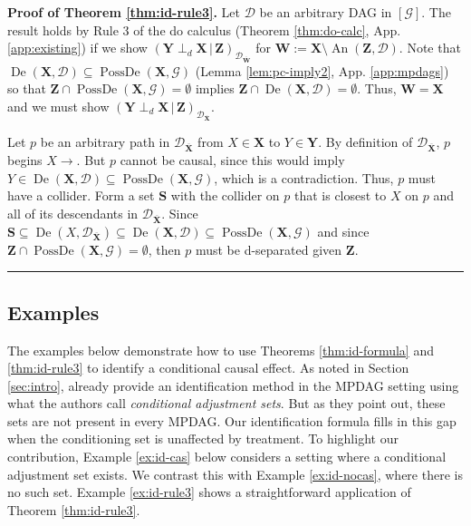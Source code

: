 \documentclass[11pt]{article}
\DeclareMathOperator{\An}{An}
\DeclareMathOperator{\De}{De}
\DeclareMathOperator{\PossDe}{PossDe}
\newcommand{\BlackBox}{\rule{1.5ex}{1.5ex}}  %
\newcommand{\mb}[1]{\mathbf{#1}}
\newcommand{\dsepp}{\perp_{d}}
\newcommand{\g}[1][G]{\mathcal{#1}}
\newenvironment{proofof}[1][]{\noindent \textbf{Proof of #1.}}{\hfill\BlackBox}
\begin{document}
\begin{proofof}[Theorem \ref{thm:id-rule3}]
    Let $\g[D]$ be an arbitrary DAG in $[\g]$. The result holds by Rule 3 of the do calculus (Theorem \ref{thm:do-calc}, App. \ref{app:existing}) if we show $(\mb{Y} \dsepp \mb{X} \,|\, \mb{Z})_{\g[D]_{\overline{\mb{W}}}}$ for $\mb{W} := \mb{X} \setminus \An(\mb{Z}, \g[D])$. Note that $\De(\mb{X}, \g[D]) \subseteq \PossDe(\mb{X}, \g)$ (Lemma \ref{lem:pc-imply2}, App. \ref{app:mpdags}) so that $\mb{Z} \cap \PossDe(\mb{X}, \g) = \emptyset$ implies $\mb{Z} \cap \De(\mb{X}, \g[D]) = \emptyset$. Thus, $\mb{W} = \mb{X}$ and we must show $(\mb{Y} \dsepp \mb{X} \,|\, \mb{Z})_{\g[D]_{\overline{\mb{X}}}}$.

    Let $p$ be an arbitrary path in $\g[D]_{\overline{\mb{X}}}$ from $X \in \mb{X}$ to $Y \in \mb{Y}$. By definition of $\g[D]_{\overline{\mb{X}}}$, $p$ begins $X \to$. But $p$ cannot be causal, since this would imply $Y \in \De(\mb{X}, \g[D]) \subseteq \PossDe(\mb{X}, \g)$, which is a contradiction. Thus, $p$ must have a collider. Form a set $\mb{S}$ with the collider on $p$ that is closest to $X$ on $p$ and all of its descendants in $\g[D]_{\overline{\mb{X}}}$. Since $\mb{S} \subseteq \De(X, \g[D]_{\overline{\mb{X}}}) \subseteq \De(\mb{X}, \g[D]) \subseteq \PossDe(\mb{X}, \g)$ and since $\mb{Z} \cap \PossDe(\mb{X}, \g) = \emptyset$, then $p$ must be d-separated given $\mb{Z}$.
\end{proofof}






\subsection{Examples}
\label{sec:id-examples}
The examples below demonstrate how to use Theorems \ref{thm:id-formula} and \ref{thm:id-rule3} to identify a conditional causal effect. As noted in Section \ref{sec:intro}, \cite{laplante2024conditional} already provide an identification method in the MPDAG setting using what the authors call \textit{conditional adjustment sets}. But as they point out, these sets are not present in every MPDAG. Our identification formula fills in this gap when the conditioning set is unaffected by treatment. To highlight our contribution, Example \ref{ex:id-cas} below considers a setting where a conditional adjustment set exists. We contrast this with Example \ref{ex:id-nocas}, where there is no such set. Example \ref{ex:id-rule3} shows a straightforward application of Theorem \ref{thm:id-rule3}.
\end{document}
